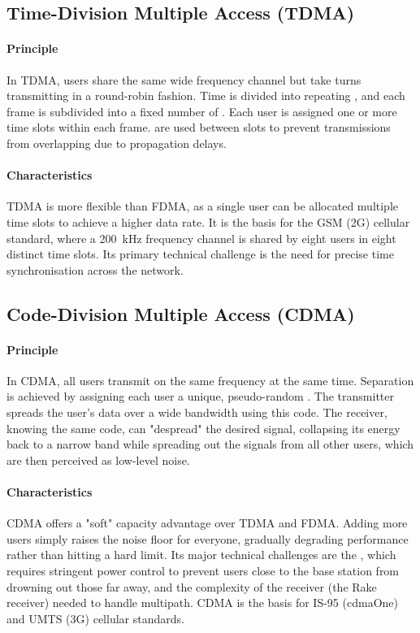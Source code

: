 \subsection{Time-Division Multiple Access (TDMA)}

\paragraph{Principle}
In TDMA, users share the same wide frequency channel but take turns transmitting in a round-robin fashion. Time is divided into repeating , and each frame is subdivided into a fixed number of . Each user is assigned one or more time slots within each frame.  are used between slots to prevent transmissions from overlapping due to propagation delays.

\paragraph{Characteristics}
TDMA is more flexible than FDMA, as a single user can be allocated multiple time slots to achieve a higher data rate. It is the basis for the GSM (2G) cellular standard, where a 200~kHz frequency channel is shared by eight users in eight distinct time slots. Its primary technical challenge is the need for precise time synchronisation across the network.

\subsection{Code-Division Multiple Access (CDMA)}

\paragraph{Principle}
In CDMA, all users transmit on the same frequency at the same time. Separation is achieved by assigning each user a unique, pseudo-random . The transmitter spreads the user's data over a wide bandwidth using this code. The receiver, knowing the same code, can "despread" the desired signal, collapsing its energy back to a narrow band while spreading out the signals from all other users, which are then perceived as low-level noise.

\paragraph{Characteristics}
CDMA offers a "soft" capacity advantage over TDMA and FDMA. Adding more users simply raises the noise floor for everyone, gradually degrading performance rather than hitting a hard limit. Its major technical challenges are the , which requires stringent power control to prevent users close to the base station from drowning out those far away, and the complexity of the receiver (the Rake receiver) needed to handle multipath. CDMA is the basis for IS-95 (cdmaOne) and UMTS (3G) cellular standards.

